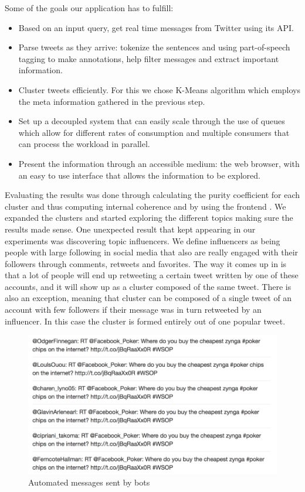 Some of the goals our application has to fulfill:
\begin{itemize}
	\item Based on an input query, get real time messages from Twitter using its API.
	\item Parse tweets as they arrive: tokenize the sentences and using part-of-speech tagging to make annotations, help filter messages and extract important information.
	\item Cluster tweets efficiently. For this we chose K-Means algorithm which employs the meta information gathered in the previous step.
	\item Set up a decoupled system that can easily scale through the use of queues which allow for different rates of consumption and multiple consumers that can process the workload in parallel.
	\item Present the information through an accessible medium: the web browser, with an easy to use interface that allows the information to be explored.
\end{itemize}
Evaluating the results was done through calculating the purity coefficient for each cluster and thus computing internal coherence and by using the frontend {\frontend}. We expanded the clusters and started exploring the different topics making sure the results made sense.
One unexpected result that kept appearing in our experiments was discovering topic influencers. We define influencers as being people with large following in social media that also are really engaged with their followers through comments, retweets and favorites. The way it comes up in {\project}  is that a lot of people will end up retweeting a certain tweet written by one of these accounts, and it will show up as a cluster composed of the same tweet. There is also an exception, meaning that cluster can be composed of a single tweet of an account with few followers if their message was in turn retweeted by an influencer. In this case the cluster is formed entirely out of one popular tweet.
\newline
\begin{figure}[ht!]
\centering
\includegraphics[width=\textwidth,height=\textheight,keepaspectratio]{src/img/bots.png}
\caption{Automated messages sent by bots\label{overflow}}
\end{figure}
